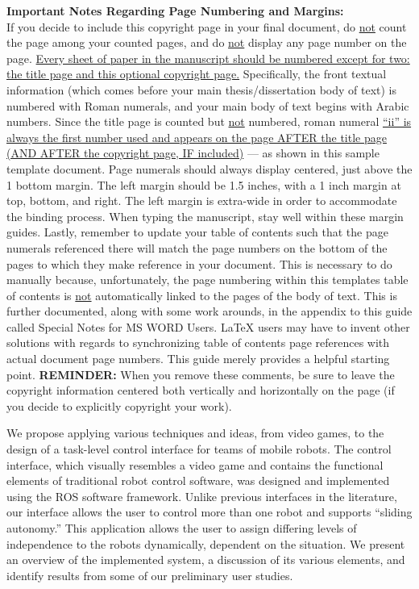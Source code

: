 \begin{thesiscopyrightpage}
\begin{singlespace}
{\small \textbf{Important Notes Regarding Page Numbering and Margins:}} \\
If you decide to include this copyright page in your final document, do
\uline{not} count the page among your counted pages, and do \uline{not} display
any page number on the page.  \uline{Every sheet of paper in the manuscript
should be numbered except for two:  the title page and this optional copyright
page.}  Specifically, the front textual information (which comes before your
main thesis/dissertation body of text) is numbered with Roman numerals, and
your main body of text begins with Arabic numbers.  Since the title page is
counted but \uline{not} numbered, roman numeral \uline{``ii'' is always the
first number used and appears on the page AFTER the title page (AND AFTER the
copyright page, IF included)} --- as shown in this sample template document.
Page numerals should always display centered, just above the 1 bottom margin.
The left margin should be 1.5 inches, with a 1 inch margin at top, bottom, and
right.  The left margin is extra-wide in order to accommodate the binding
process.  When typing the manuscript, stay well within these margin guides.
Lastly, remember to update your table of contents such that the page numerals
referenced there will match the page numbers on the bottom of the pages to
which they make reference in your document.  This is necessary to do manually
because, unfortunately, the page numbering within this templates table of
contents is \uline{not} automatically linked to the pages of the body of text.
This is further documented, along with some work arounds, in the appendix to
this guide called Special Notes for MS WORD Users.  \LaTeX{} users may have to
invent other solutions with regards to synchronizing table of contents page
references with actual document page numbers.  This guide merely provides a
helpful starting point.  \textbf{REMINDER:} When you remove these comments, be
sure to leave the copyright information centered both vertically and
horizontally on the page (if you decide to explicitly copyright your work).
\end{singlespace}
\fi
\end{thesiscopyrightpage}

\begin{thesisabstract}
We propose applying various techniques and ideas, from video games, to the design of a task-level control interface for teams of mobile robots.  The control interface, which visually resembles a video game and contains the functional elements of traditional robot control software, was designed and implemented using the ROS software framework. Unlike previous interfaces in the literature, our interface allows the user to control more than one robot and supports ``sliding autonomy.'' This application allows the user to assign differing levels of independence to the robots dynamically, dependent on the situation.  We present an overview of the implemented system, a discussion of its various elements, and identify results from some of our preliminary user studies.
\end{thesisabstract}

